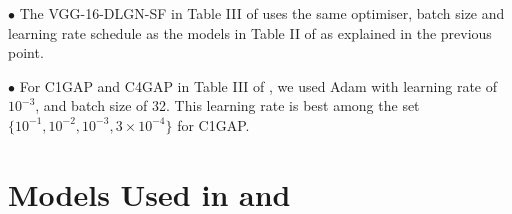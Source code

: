 $\bullet$ The VGG-16-DLGN-SF in Table III of  uses the same optimiser, batch size and learning rate schedule as the models in Table II of  as explained in the previous point.

$\bullet$ For C1GAP and C4GAP in Table III of , we used Adam \citep{adam} with learning rate of $10^{-3}$, and batch size of 32. This learning rate is best among the set $\{10^{-1},10^{-2},10^{-3}, 3\times 10^{-4}\}$ for C1GAP.
\newpage
\section{Models Used in  and }


